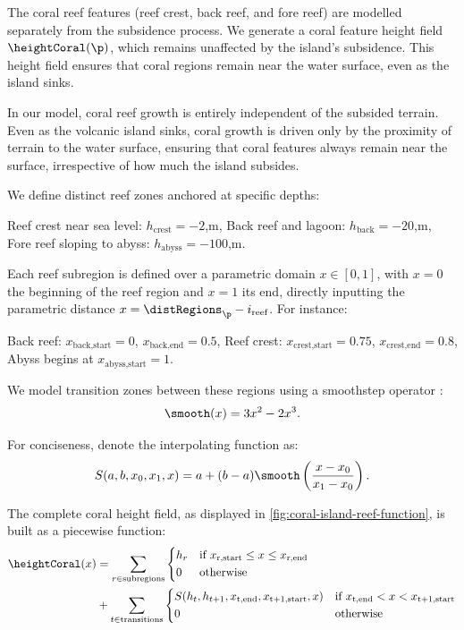 The coral reef features (reef crest, back reef, and fore reef) are modelled separately from the subsidence process. We generate a coral feature height field $\heightCoral(\p)$, which remains unaffected by the island's subsidence. This height field ensures that coral regions remain near the water surface, even as the island sinks.

In our model, coral reef growth is entirely independent of the subsided terrain. Even as the volcanic island sinks, coral growth is driven only by the proximity of terrain to the water surface, ensuring that coral features always remain near the surface, irrespective of how much the island subsides.

We define distinct reef zones anchored at specific depths:
\begin{Itemize}
    \Item{} Reef crest near sea level: $h_\text{crest} = -2$,m,
    \Item{} Back reef and lagoon: $h_\text{back} = -20$,m,
    \Item{} Fore reef sloping to abyss: $h_\text{abyss} = -100$,m.
\end{Itemize}

Each reef subregion is defined over a parametric domain $x \in [0, 1]$, with $x=0$ the beginning of the reef region and $x=1$ its end, directly inputting the parametric distance $x = \distRegions_\p - i_{\text{reef}}$. For instance:
\begin{Itemize}
    \Item{} Back reef: $x_{\text{back,start}} = 0$, $x_{\text{back,end}} = 0.5$,
    \Item{} Reef crest: $x_{\text{crest,start}} = 0.75$, $x_{\text{crest,end}} = 0.8$,
    \Item{} Abyss begins at $x_{\text{abyss,start}} = 1$.
\end{Itemize}

We model transition zones between these regions using a smoothstep operator \cite{Perlin2002}:
\begin{align}
    \smooth(x) = 3x^2 - 2x^3.
\end{align}

For conciseness, denote the interpolating function as:
\begin{align}
    S(a, b, x_0, x_1, x) = a + (b-a) \smooth\left(\frac{x - x_0}{x_1 - x_0}\right).
\end{align}

The complete coral height field, as displayed in \cref{fig:coral-island-reef-function}, is built as a piecewise function:
\begin{align}
    \label{eq:coral-island-full-reef-function}
    \heightCoral(x) &= \sum_{r \in \text{subregions}}{
    \begin{dcases}
        h_r & \text{if } x_{\text{r,start}} \leq x \leq x_{\text{r,end}} \\
        0 & \text{otherwise}
    \end{dcases}
    } \nonumber \\
    &+
    \sum_{t \in \text{transitions}} {
    \begin{dcases}
        S(h_{t}, h_{t+1}, x_{\text{t,end}}, x_{\text{t+1,start}}, x) & \text{if } x_{\text{t,end}} < x < x_{\text{t+1,start}} \\
        0 & \text{otherwise}
    \end{dcases}
    }
\end{align}

